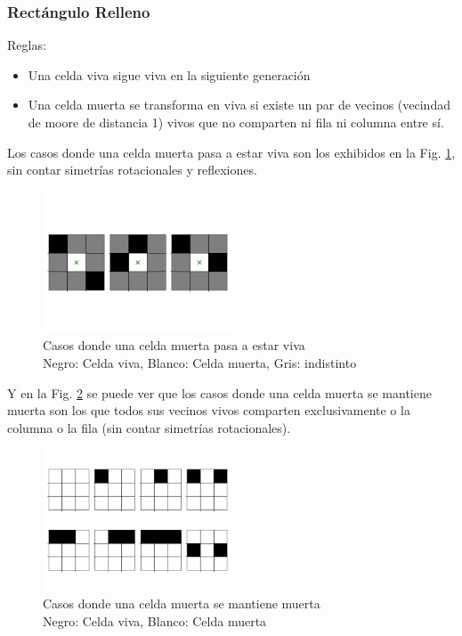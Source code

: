 \subsubsection{Rectángulo Relleno}
Reglas:
\begin{itemize}
    \item Una celda viva sigue viva en la siguiente generación
    \item Una celda muerta se transforma en viva si existe un par de vecinos (vecindad de moore de distancia 1) vivos que no comparten ni fila ni columna entre sí.
\end{itemize}
Los casos donde una celda muerta pasa a estar viva son los exhibidos en la Fig. \ref{fig:filllive}, sin contar simetrías rotacionales y reflexiones.
\begin{figure}[H]
    \centering
    \includegraphics[width=0.5\textwidth]{Images/fill_example_1b}
    \captionsetup{justification=centering}
    \caption{Casos donde una celda muerta pasa a estar viva \\ Negro: Celda viva, Blanco: Celda muerta, Gris: indistinto}
    \label{fig:filllive}
\end{figure}

Y en la Fig. \ref{fig:filldead} se puede ver que los casos donde una celda muerta se mantiene muerta son los que todos sus vecinos vivos comparten exclusivamente o la columna o la fila (sin contar simetrías rotacionales).
\begin{figure}[H]
    \centering
    \includegraphics[width=0.5\textwidth]{Images/fill_example_1a}
    \captionsetup{justification=centering}
    \caption{Casos donde una celda muerta se mantiene muerta\\ Negro: Celda viva, Blanco: Celda muerta}
    \label{fig:filldead}
\end{figure}

